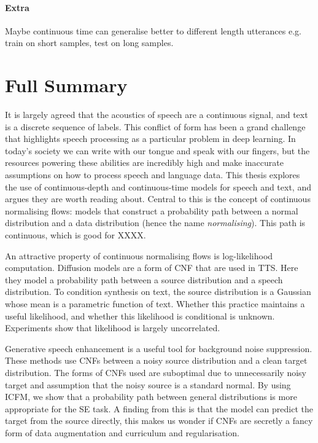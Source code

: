 
\paragraph{Extra}
Maybe continuous time can generalise better to different length utterances e.g. train on short samples, test on long samples.



\section{Full Summary}
It is largely agreed that the acoustics of speech are a continuous signal, and text is a discrete sequence of labels. This conflict of form has been a grand challenge that highlights speech processing as a particular problem in deep learning.
In today's society we can write with our tongue and speak with our fingers, but the resources powering these abilities are incredibly high and make inaccurate assumptions on how to process speech and language data. This thesis explores the use of continuous-depth and continuous-time models for speech and text, and argues they are worth reading about. Central to this is the concept of continuous normalising flows: models that construct a probability path between a normal distribution and a data distribution (hence the name \textit{normalising}). This path is continuous, which is good for XXXX.

An attractive property of continuous normalising flows is log-likelihood computation. Diffusion models are a form of CNF that are used in TTS. Here they model a probability path between a source distribution and a speech distribution. To condition synthesis on text, the source distribution is a Gaussian whose mean is a parametric function of text. Whether this practice maintains a useful likelihood, and whether this likelihood is conditional is unknown. Experiments show that likelihood is largely uncorrelated.

Generative speech enhancement is a useful tool for background noise suppression. These methods use CNFs between a noisy source distribution and a clean target distribution. The forms of CNFs used are suboptimal due to unnecessarily noisy target and assumption that the noisy source is a standard normal. By using ICFM, we show that a probability path between general distributions is more appropriate for the SE task. A finding from this is that the model can predict the target from the source directly, this makes us wonder if CNFs are secretly a fancy form of data augmentation and curriculum and regularisation.

